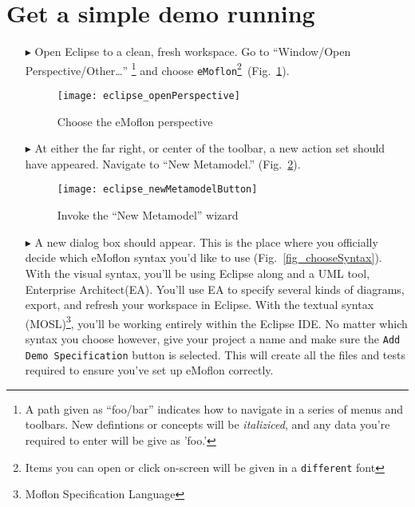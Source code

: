 \newpage
\genHeader

\section{Get a simple demo running}


\begin{itemize}
\hypertarget{simpleDemo common}{} 
\item[$\blacktriangleright$] Open Eclipse to a clean, fresh workspace. Go to ``Window/Open Perspective/Other\ldots'' \footnote{A path given as ``foo/bar''
indicates how to navigate in a series of menus and toolbars. New defintions or concepts will be \emph{italiziced}, and any data you're required to enter will be
give as 'foo.'} and choose \texttt{eMoflon}\footnote{Items you can open or click on-screen will be given in a \texttt{different} font}~(Fig.~\ref{fig_eclipse}).

\begin{figure}[htbp]
	\centering
  \texttt{[image: eclipse\_openPerspective]}
	\caption{Choose the eMoflon perspective}
	\label{fig_eclipse}
\end{figure} 

\item[$\blacktriangleright$] At either the far right, or center of the toolbar, a new action set should have appeared. Navigate to ``New Metamodel.''
(Fig.~\ref{fig_eclipseNewMetamodelButton}).

\vspace{0.5cm}
\begin{figure}[htbp]
	\centering
  \texttt{[image: eclipse\_newMetamodelButton]}
	\caption{Invoke the ``New Metamodel'' wizard}
	\label{fig_eclipseNewMetamodelButton}
\end{figure}

\newpage
\item[$\blacktriangleright$] A new dialog box should appear. This is the place where you officially decide which eMoflon syntax you'd like to use
(Fig.~\ref{fig_chooseSyntax}). With the visual syntax, you'll be using Eclipse along and a UML tool, Enterprise Architect(EA). You'll use EA to specify several
kinds of diagrams, export, and refresh your workspace in Eclipse. With the textual syntax (MOSL)\footnote{Moflon Specification Language}, you'll be working
entirely within the Eclipse IDE. No matter which syntax you choose however, give your project a name and make sure the \texttt{Add Demo Specification} button is
selected. This will create all the files and tests required to ensure you've set up eMoflon correctly.


\end{itemize}
